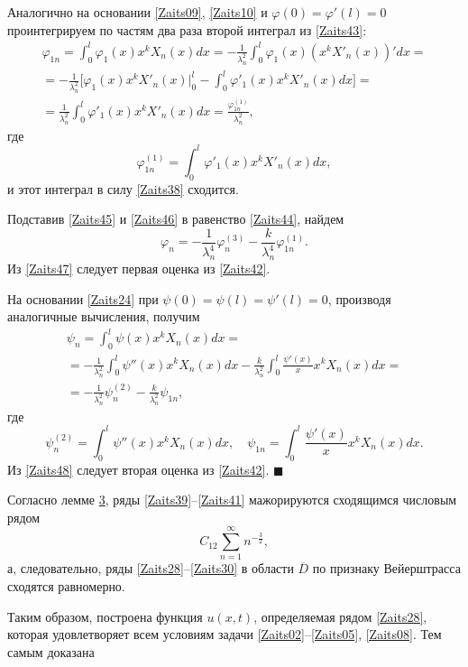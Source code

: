 Аналогично на основании \eqref{Zaits09}, \eqref{Zaits10} и $\varphi(0)=\varphi'(l)=0$ проинтегрируем по частям два раза второй интеграл из \eqref{Zaits43}:
\begin{multline}
\label{Zaits46}
\varphi_{1n}= \int _0^l\varphi_1(x)x^kX_n(x)dx=-\frac{1}{\lambda_n^2} \int _0^l\varphi_1(x)\left(x^kX'_n(x)\right)'dx=\\
=-\frac{1}{\lambda_n^2}
\biggl[\varphi_1(x)x^kX'_n(x)\Bigr|_0^l- \int _0^l\varphi'_1(x)x^kX'_n(x)dx\biggr]=\\
=\frac{1}{\lambda_n^2} \int _0^l\varphi'_1(x)x^kX'_n(x)dx=\frac{\varphi_{1n}^{(1)}}{\lambda_n^2},
\end{multline}
где
$$\varphi_{1n}^{(1)}= \int _0^l\varphi'_1(x)x^kX'_n(x)dx,$$
и этот интеграл в силу \eqref{Zaits38} сходится.

Подставив \eqref{Zaits45} и \eqref{Zaits46} в равенство \eqref{Zaits44}, найдем
\begin{equation}
\label{Zaits47}
\varphi_n=-\frac{1}{\lambda_n^4}\varphi_n^{(3)}-\frac{k}{\lambda_n^4}\varphi_{1n}^{(1)}.
\end{equation}
Из \eqref{Zaits47} следует первая оценка из \eqref{Zaits42}.

На основании \eqref{Zaits24} при $\psi(0)=\psi(l)=\psi'(l)=0$, производя аналогичные вычисления, получим
\begin{multline}
\label{Zaits48}
\psi_n= \int _0^l\psi(x)x^kX_n(x)dx=\\
=-\frac{1}{\lambda_n^2} \int _0^l\psi''(x)x^kX_n(x)dx-\frac{k}{\lambda_n^2} \int _0^l\frac{\psi'(x)}{x}x^kX_n(x)dx=\\
=-\frac{1}{\lambda_n^2}\psi_n^{(2)}-\frac{k}{\lambda_n^2}\psi_{1n},
\end{multline}
где
$$
\psi_n^{(2)}= \int _0^l\psi''(x)x^kX_n(x)dx,\quad \psi_{1n}= \int _0^l\frac{\psi'(x)}{x}x^kX_n(x)dx.
$$
Из \eqref{Zaits48} следует вторая оценка из \eqref{Zaits42}. $\blacksquare$

\smallskip

Согласно лемме \hyperlink{zay:l3}{3}, ряды \eqref{Zaits39}--\eqref{Zaits41} мажорируются сходящимся числовым рядом
\begin{equation}
\label{Zaits49}
C_{12}\sum\limits_{n=1}^\infty n^{-\frac32},
\end{equation}
а, следовательно,  ряды \eqref{Zaits28}--\eqref{Zaits30}  в области $\overline{D}$ по признаку Вейерштрасса сходятся равномерно.

Таким образом, построена функция $u(x,t)$, определяемая рядом \eqref{Zaits28}, 
которая удовлетворяет всем условиям задачи \eqref{Zaits02}--\eqref{Zaits05}, \eqref{Zaits08}. Тем самым доказана

